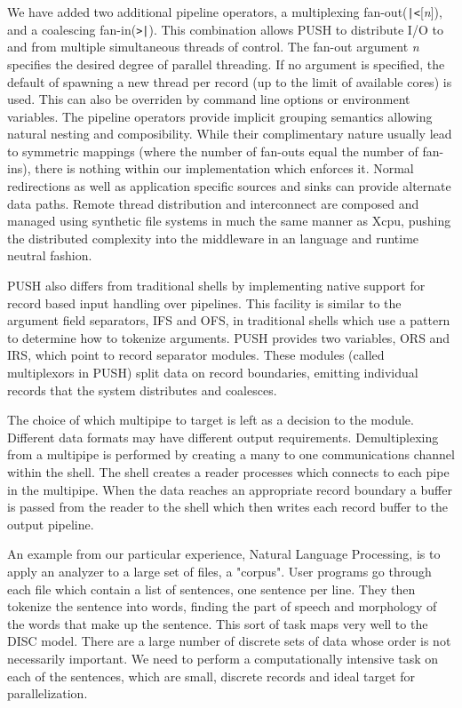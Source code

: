 \documentclass{sig-alt-release2}
\begin{document}
We have added two additional pipeline operators, 
a multiplexing fan-out(\verb!|<![\emph{n}]), and a coalescing fan-in(\verb!>|!). 
This combination allows PUSH to distribute I/O to and from multiple
simultaneous threads of control.
The fan-out argument \emph{n} specifies the desired degree of parallel 
threading.  If no argument is specified, the default of spawning a new
thread per record (up to the limit of available cores) is used.  This can
also be overriden by command line options or environment variables.
The pipeline operators provide implicit grouping semantics allowing natural 
nesting and composibility.
While their complimentary nature usually lead to symmetric
mappings (where the number of fan-outs equal the number of fan-ins), there is 
nothing within our implementation which enforces it.
Normal redirections as well as application specific sources and sinks 
can provide alternate data paths.
Remote thread distribution and interconnect are composed and managed
using synthetic file systems in much the same manner as Xcpu,\cite{xcpu}
pushing the distributed complexity into the middleware in an language and 
runtime neutral fashion.

PUSH also differs from traditional shells by implementing native support for 
record based input handling over pipelines. This facility is similar to the 
argument field separators, IFS and OFS, in traditional shells which use a 
pattern to determine how to tokenize arguments. PUSH provides two variables,  
ORS and IRS, which point to record separator modules. These modules 
(called multiplexors in PUSH) split data on record boundaries, emitting 
individual records that the system distributes and coalesces. 

The choice of which multipipe to target is left as a decision to the module. 
Different data formats may have different output requirements. 
Demultiplexing from a multipipe is performed by creating a many to one 
communications channel within the shell. The shell creates a reader processes 
which connects to each pipe in the multipipe. When the data reaches an 
appropriate record boundary a buffer is passed from the reader to the shell 
which then writes each record buffer to the output pipeline. 

An example from our particular experience, Natural Language Processing, is 
to apply an analyzer to a large set of files, a "corpus". User programs go 
through each file which contain a list of sentences, one sentence per line. 
They then tokenize the sentence into words, finding the part of speech and 
morphology of the words that make up the sentence.
This sort of task maps very well to the DISC model. There are a large number of 
discrete sets of data whose order is not necessarily important. We need to 
perform a computationally intensive task on each of the sentences, which are 
small, discrete records and ideal target for parallelization. 
\end{document}
